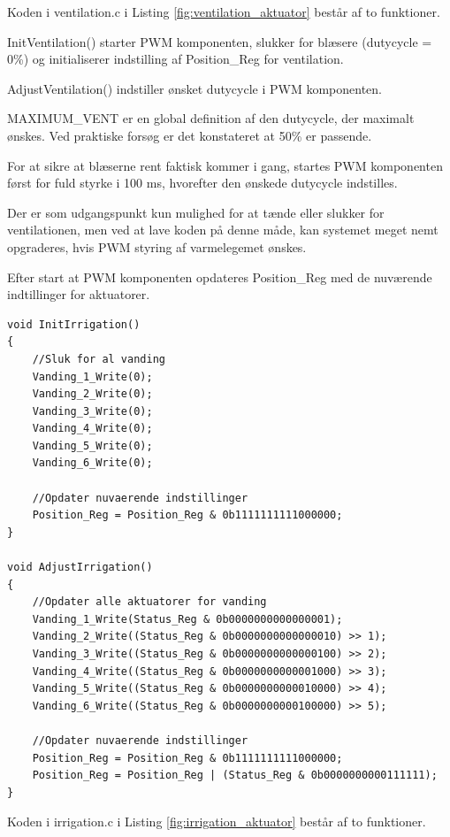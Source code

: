 Koden i ventilation.c i Listing \ref{fig:ventilation_aktuator} består af to funktioner. 

InitVentilation() starter PWM komponenten, slukker for blæsere (dutycycle = 0\%) og initialiserer indstilling af Position\_Reg for ventilation.

AdjustVentilation() indstiller ønsket dutycycle i PWM komponenten. 

MAXIMUM\_VENT er en global definition af den dutycycle, der maximalt ønskes. Ved praktiske forsøg er det konstateret at 50\% er passende.

For at sikre at blæserne rent faktisk kommer i gang, startes PWM komponenten først for fuld styrke i 100 ms, hvorefter den ønskede dutycycle indstilles.

Der er som udgangspunkt kun mulighed for at tænde eller slukker for ventilationen, men ved at lave koden på denne måde, kan systemet meget nemt opgraderes, hvis PWM styring af varmelegemet ønskes. 

Efter start at PWM komponenten opdateres Position\_Reg med de nuværende indtillinger for aktuatorer.

\clearpage

\begin{lstlisting}[caption=Udsnit af irrigation.c for PSoC4 i Aktuator, label=fig:irrigation_aktuator]
void InitIrrigation()
{
    //Sluk for al vanding
    Vanding_1_Write(0);
    Vanding_2_Write(0);
    Vanding_3_Write(0);
    Vanding_4_Write(0);
    Vanding_5_Write(0);
    Vanding_6_Write(0);
    
    //Opdater nuvaerende indstillinger
    Position_Reg = Position_Reg & 0b1111111111000000;
}

void AdjustIrrigation()
{
    //Opdater alle aktuatorer for vanding
    Vanding_1_Write(Status_Reg & 0b0000000000000001);
    Vanding_2_Write((Status_Reg & 0b0000000000000010) >> 1);
    Vanding_3_Write((Status_Reg & 0b0000000000000100) >> 2);
    Vanding_4_Write((Status_Reg & 0b0000000000001000) >> 3);
    Vanding_5_Write((Status_Reg & 0b0000000000010000) >> 4);
    Vanding_6_Write((Status_Reg & 0b0000000000100000) >> 5);
    
    //Opdater nuvaerende indstillinger
    Position_Reg = Position_Reg & 0b1111111111000000;
    Position_Reg = Position_Reg | (Status_Reg & 0b0000000000111111);
}
\end{lstlisting}

Koden i irrigation.c i Listing \ref{fig:irrigation_aktuator} består af to funktioner. 

